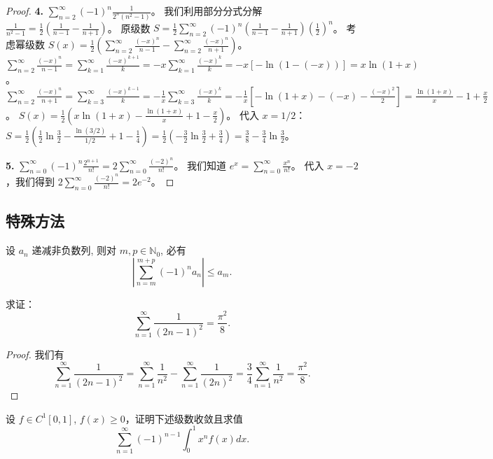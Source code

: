 \documentclass[lang=cn,10pt,thmcnt=section]{elegantbook}
\begin{document}
\begin{proof}
		\textbf{4. } $\sum_{n=2}^{\infty} (-1)^n \frac{1}{2^n (n^2 - 1)}$。
		我们利用部分分式分解 $\frac{1}{n^2-1} = \frac{1}{2}\left(\frac{1}{n-1} - \frac{1}{n+1}\right)$。
		原级数 $S = \frac{1}{2} \sum_{n=2}^\infty (-1)^n \left(\frac{1}{n-1} - \frac{1}{n+1}\right) \left(\frac{1}{2}\right)^n$。
		考虑幂级数 $S(x) = \frac{1}{2} \left( \sum_{n=2}^\infty \frac{(-x)^n}{n-1} - \sum_{n=2}^\infty \frac{(-x)^n}{n+1} \right)$。
		$\sum_{n=2}^\infty \frac{(-x)^n}{n-1} = \sum_{k=1}^\infty \frac{(-x)^{k+1}}{k} = -x \sum_{k=1}^\infty \frac{(-x)^k}{k} = -x[-\ln(1-(-x))] = x\ln(1+x)$。
		$\sum_{n=2}^\infty \frac{(-x)^n}{n+1} = \sum_{k=3}^\infty \frac{(-x)^{k-1}}{k} = -\frac{1}{x} \sum_{k=3}^\infty \frac{(-x)^k}{k} = -\frac{1}{x}[-\ln(1+x) - (-x) - \frac{(-x)^2}{2}] = \frac{\ln(1+x)}{x} - 1 + \frac{x}{2}$。
		$S(x) = \frac{1}{2} \left( x\ln(1+x) - \frac{\ln(1+x)}{x} + 1 - \frac{x}{2} \right)$。
		代入 $x=1/2$：$S = \frac{1}{2} \left( \frac{1}{2}\ln\frac{3}{2} - \frac{\ln(3/2)}{1/2} + 1 - \frac{1}{4} \right) = \frac{1}{2} \left( -\frac{3}{2}\ln\frac{3}{2} + \frac{3}{4} \right) = \frac{3}{8} - \frac{3}{4}\ln\frac{3}{2}$。
		
		\textbf{5. } $\sum_{n=0}^{\infty} (-1)^n \frac{2^{n+1}}{n!} = 2 \sum_{n=0}^{\infty} \frac{(-2)^n}{n!}$。
		我们知道 $e^x = \sum_{n=0}^\infty \frac{x^n}{n!}$。
		代入 $x=-2$，我们得到 $2 \sum_{n=0}^\infty \frac{(-2)^n}{n!} = 2e^{-2}$。
	\end{proof}
\subsection{特殊方法}
\begin{theorem}[交错级数不等式]
	设 $a_n$ 递减非负数列, 则对 $m, p \in \mathbb{N}_0$, 必有
\[
\left| \sum_{n=m}^{m+p} (-1)^n a_n \right| \le a_m.
\]
\end{theorem}
\begin{example}
	求证：
\[
\sum_{n=1}^{\infty} \frac{1}{(2n-1)^2} = \frac{\pi^2}{8}.
\]
\end{example}
\begin{proof}
	我们有
\[
\sum_{n=1}^\infty \frac{1}{(2n-1)^2} = \sum_{n=1}^\infty \frac{1}{n^2} - \sum_{n=1}^\infty \frac{1}{(2n)^2} = \frac{3}{4} \sum_{n=1}^\infty \frac{1}{n^2} = \frac{\pi^2}{8}.
\]
\end{proof}
\begin{example}
	设 $f \in C^1[0,1]$, $f(x) \geq 0$，证明下述级数收敛且求值
\[
\sum_{n=1}^{\infty} (-1)^{n-1} \int_0^1 x^n f(x) dx.
\]
\end{example}
\end{document}

